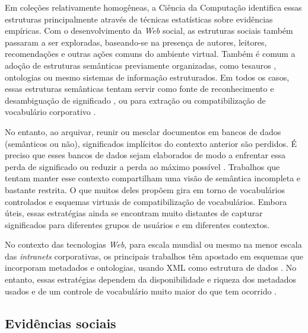 Em coleções relativamente homogêneas, a Ciência da Computação identifica essas estruturas principalmente através de técnicas estatísticas sobre evidências empíricas. Com o desenvolvimento da \textit{Web} social, as estruturas sociais também passaram a ser exploradas, baseando-se na presença de autores, leitores, recomendações e outras ações comuns do ambiente virtual. Também é comum a adoção de estruturas semânticas previamente organizadas, como tesauros \cite{salton88}, ontologias \cite{albani06,sosnovsky10,fernandez11} ou mesmo sistemas de informação estruturados. Em todos os casos, essas estruturas semânticas tentam servir como fonte de reconhecimento e desambiguação de significado \cite{hu2010enterprisecase}, ou para extração \cite{dolby09extractingVocabularies} ou compatibilização de vocabulário corporativo \cite{omelayenko02integratingVocabularies}.

No entanto, ao arquivar, reunir ou mesclar documentos em bancos de dados (semânticos ou não), significados implícitos do contexto anterior são perdidos. É preciso que esses bancos de dados sejam elaborados de modo a enfrentar essa perda de significado ou reduzir a perda ao máximo possível \cite{hjorland2002domain}. Trabalhos que tentam manter esse contexto compartilham uma visão de semântica incompleta e bastante restrita. O que muitos deles propõem gira em torno de vocabulários controlados e esquemas virtuais de compatibilização de vocabulários. Embora úteis, essas estratégias ainda se encontram muito distantes de capturar significados para diferentes grupos de usuários e em diferentes contextos.

No contexto das tecnologias \textit{Web}, para escala mundial ou mesmo na menor escala das \textit{intranets} corporativas, os principais trabalhos têm apostado em esquemas que incorporam metadados e ontologias, usando XML como estrutura de dados \cite{solomon2002}. No entanto, essas estratégias dependem da disponibilidade e riqueza dos metadados usados e de um controle de vocabulário muito maior do que tem ocorrido \cite{labarre2010,ontology12}.

\subsection{Evidências sociais}%

